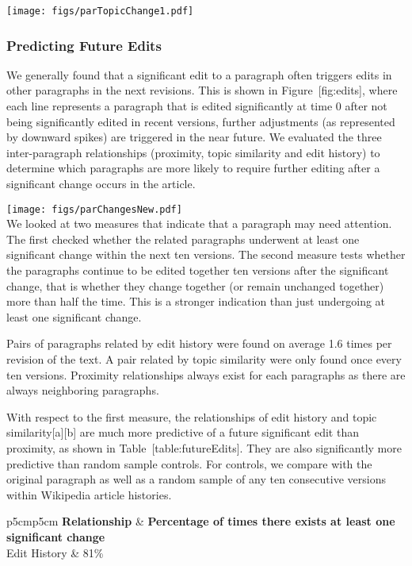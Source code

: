 \texttt{[image: figs/parTopicChange1.pdf]}\\

\subsubsection{Predicting Future Edits}\label{predicting-future-edits-1}

We generally found that a significant edit to a paragraph often triggers
edits in other paragraphs in the next revisions. This is shown in
Figure~{[}fig:edits{]}, where each line represents a paragraph that is
edited significantly at time 0 after not being significantly edited in
recent versions, further adjustments (as represented by downward spikes)
are triggered in the near future. We evaluated the three inter-paragraph
relationships (proximity, topic similarity and edit history) to
determine which paragraphs are more likely to require further editing
after a significant change occurs in the article.

\texttt{[image: figs/parChangesNew.pdf]}\\

We looked at two measures that indicate that a paragraph may need
attention. The first checked whether the related paragraphs underwent at
least one significant change within the next ten versions. The second
measure tests whether the paragraphs continue to be edited together ten
versions after the significant change, that is whether they change
together (or remain unchanged together) more than half the time. This is
a stronger indication than just undergoing at least one significant
change.

Pairs of paragraphs related by edit history were found on average 1.6
times per revision of the text. A pair related by topic similarity were
only found once every ten versions. Proximity relationships always exist
for each paragraphs as there are always neighboring paragraphs.

With respect to the first measure, the relationships of edit history and
topic similarity{[}a{]}{[}b{]} are much more predictive of a future
significant edit than proximity, as shown in
Table~{[}table:futureEdits{]}. They are also significantly more
predictive than random sample controls. For controls, we compare with
the original paragraph as well as a random sample of any ten consecutive
versions within Wikipedia article histories.

{\textbar{}p{5cm}\textbar{}p{5cm}\textbar{}} \textbf{Relationship} \&
\textbf{Percentage of times there exists at least one significant
change}\\Edit History \& 81\%\\

